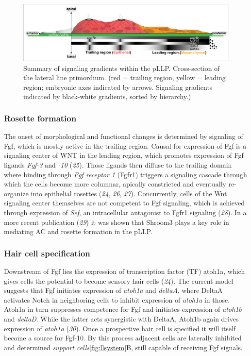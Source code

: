 \documentclass[11pt,singlespacinge,twoside]{reedthesis} %
\begin{document}
\begin{figure}

{\centering \includegraphics[width=.75\textwidth]{figures/intro/pllp} 

}

\caption[Summary of signaling gradients within the pLLP]{Summary of signaling gradients within the pLLP. Cross-section of the lateral line primordium. (red = trailing region, yellow = leading region; embryonic axes indicated by arrows. Signaling gradients indicated by black-white gradients, sorted by hierarchy.)}\label{fig:pllp}
\end{figure}
\hypertarget{rosette-formation}{%
\subsubsection{Rosette formation}\label{rosette-formation}}

The onset of morphological and functional changes is determined by signaling of Fgf, which is mostly active in the trailing region. Causal for expression of Fgf is a signaling center of WNT in the leading region, which promotes expression of Fgf ligands \emph{Fgf-3} and \emph{-10} (\emph{25}). Those ligands then diffuse to the trailing domain where binding through \emph{Fgf receptor 1} (Fgfr1) triggers a signaling cascade through which the cells become more columnar, apically constricted and eventually re-organize into epithelial rosettes (\emph{24}, \emph{26}, \emph{27}). Concurrently, cells of the Wnt signaling center themselves are not competent to Fgf signaling, which is achieved through expression of \emph{Sef}, an intracellular antagonist to Fgfr1 signaling (\emph{28}). In a more recent publication (\emph{29}) it was shown that Shroom3 plays a key role in mediating AC and rosette formation in the pLLP.

\hypertarget{hair-cell-specification}{%
\subsubsection{Hair cell specification}\label{hair-cell-specification}}

Downstream of Fgf lies the expression of transcription factor (TF) atoh1a, which gives cells the potential to become sensory hair cells (\emph{24}). The current model suggests that Fgf initiates expression of \emph{atoh1a} and \emph{deltaA}, where DeltaA activates Notch in neighboring cells to inhibit expression of \emph{atoh1a} in those. Atoh1a in turn suppresses competence for Fgf and initiates expression of \emph{atoh1b} and \emph{deltaD}. While the latter acts synergistic with DeltaA, Atoh1b again drives expression of \emph{atoh1a} (\emph{30}). Once a prospective hair cell is specified it will itself become a source for Fgf-10. By this process adjacent cells are laterally inhibited and determined \emph{support cells}\ref{fig:llsystem}B, still capable of receiving Fgf signals.
\end{document}
